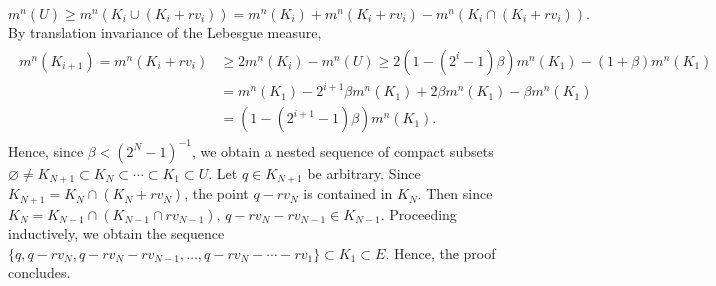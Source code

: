\documentclass{article}
\begin{document}
\begin{solutions}
		\begin{equation}
			m^{n}(U) \geq m^{n}(K_{i} \cup (K_{i} + rv_{i})) = m^{n}(K_{i}) + m^{n}(K_{i} + rv_{i}) - m^{n}(K_{i} \cap (K_{i} + rv_{i})). 
		\end{equation}
	By translation invariance of the Lebesgue measure, 
		\begin{align}
			\begin{split}
			m^{n}(K_{i + 1}) = m^{n}(K_{i} + rv_{i}) &\geq 2m^{n}(K_{i}) - m^{n}(U) \geq 2(1 - (2^{i} - 1)\beta)m^{n}(K_{1}) - (1 + \beta)m^{n}(K_{1}) \\
			&= m^{n}(K_{1}) - 2^{i + 1}\beta m^{n}(K_{1}) + 2 \beta m^{n}(K_{1}) - \beta m^{n}(K_{1}) \\
			&= (1 - (2^{i + 1} - 1)\beta)m^{n}(K_{1}). 
			\end{split} 
		\end{align}
	Hence, since $\beta < (2^{N} - 1)^{-1}$, we obtain a nested sequence of compact subsets $\varnothing \neq K_{N + 1} \subset K_{N} \subset \dotsm\subset K_{1} \subset U$. Let $q \in K_{N + 1}$ be arbitrary. Since $K_{N + 1} = K_{N} \cap (K_{N} + rv_{N})$, the point $q - rv_{N}$ is contained in $K_{N}$. Then since $K_{N} = K_{N - 1} \cap (K_{N - 1} \cap rv_{N - 1})$, $q - rv_{N} - rv_{N - 1} \in K_{N - 1}$. Proceeding inductively, we obtain the sequence $\{q, q - rv_{N}, q - rv_{N} - rv_{N - 1}, \ldots, q - rv_{N} - \dotsm -rv_{1}\} \subset K_{1} \subset E$. Hence, the proof concludes. 
\end{solutions}
\end{document}
